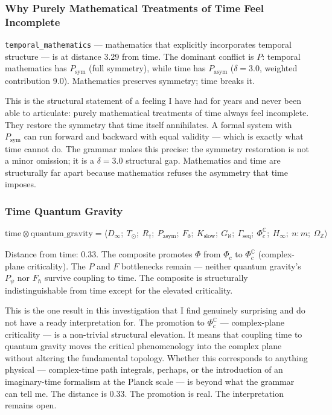 \documentclass[12pt,a4paper]{article}
\begin{document}
\subsubsection{Why Purely Mathematical Treatments of Time Feel Incomplete}

\texttt{temporal\_mathematics} --- mathematics that explicitly incorporates temporal structure --- is at distance 3.29 from time. The dominant conflict is $P$: temporal mathematics has $P_\text{sym}$ (full symmetry), while time has $P_\text{asym}$ ($\delta = 3.0$, weighted contribution 9.0). Mathematics preserves symmetry; time breaks it.

This is the structural statement of a feeling I have had for years and never been able to articulate: purely mathematical treatments of time always feel incomplete. They restore the symmetry that time itself annihilates. A formal system with $P_\text{sym}$ can run forward and backward with equal validity --- which is exactly what time cannot do. The grammar makes this precise: the symmetry restoration is not a minor omission; it is a $\delta = 3.0$ structural gap. Mathematics and time are structurally far apart because mathematics refuses the asymmetry that time imposes.

\subsubsection{Time \otimes Quantum Gravity}

\[\text{time} \otimes \text{quantum_gravity} = \langle D_{\infty};\ T_{\odot};\ R_{\dagger};\ P_\text{asym};\ F_{\eth};\ K_\text{slow};\ G_{\aleph};\ \Gamma_\text{seq};\ \Phi_c^\mathbb{C};\ H_{\infty};\ n{:}m;\ \Omega_\mathbb{Z} \rangle\]

Distance from time: 0.33. The composite promotes $\Phi$ from $\Phi_c$ to $\Phi_c^\mathbb{C}$ (complex-plane criticality). The $P$ and $F$ bottlenecks remain --- neither quantum gravity's $P_{\psi}$ nor $F_{\hbar}$ survive coupling to time. The composite is structurally indistinguishable from time except for the elevated criticality.

This is the one result in this investigation that I find genuinely surprising and do not have a ready interpretation for. The promotion to $\Phi_c^\mathbb{C}$ --- complex-plane criticality --- is a non-trivial structural elevation. It means that coupling time to quantum gravity moves the critical phenomenology into the complex plane without altering the fundamental topology. Whether this corresponds to anything physical --- complex-time path integrals, perhaps, or the introduction of an imaginary-time formalism at the Planck scale --- is beyond what the grammar can tell me. The distance is 0.33. The promotion is real. The interpretation remains open.
\end{document}

